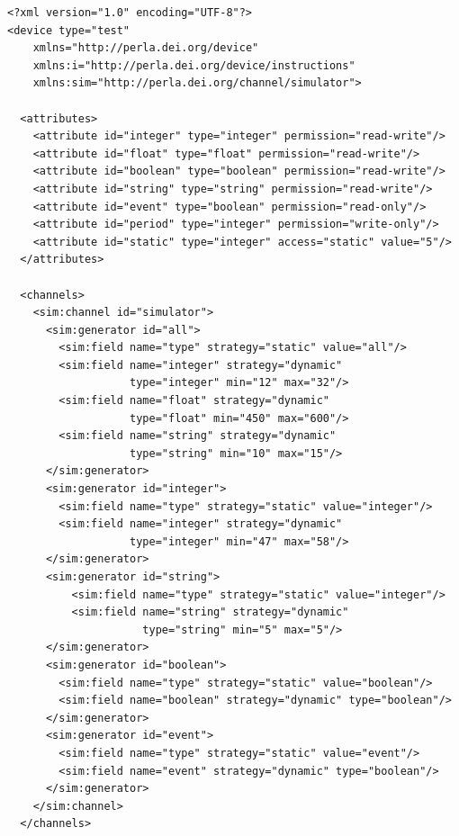 \begin{lstlisting}
<?xml version="1.0" encoding="UTF-8"?>
<device type="test"
    xmlns="http://perla.dei.org/device"
    xmlns:i="http://perla.dei.org/device/instructions"
    xmlns:sim="http://perla.dei.org/channel/simulator">

  <attributes>
    <attribute id="integer" type="integer" permission="read-write"/>
    <attribute id="float" type="float" permission="read-write"/>
    <attribute id="boolean" type="boolean" permission="read-write"/>
    <attribute id="string" type="string" permission="read-write"/>
    <attribute id="event" type="boolean" permission="read-only"/>
    <attribute id="period" type="integer" permission="write-only"/>
    <attribute id="static" type="integer" access="static" value="5"/>
  </attributes>

  <channels>
    <sim:channel id="simulator">
      <sim:generator id="all">
        <sim:field name="type" strategy="static" value="all"/>
        <sim:field name="integer" strategy="dynamic"
                   type="integer" min="12" max="32"/>
        <sim:field name="float" strategy="dynamic"
                   type="float" min="450" max="600"/>
        <sim:field name="string" strategy="dynamic"
                   type="string" min="10" max="15"/>
      </sim:generator>
      <sim:generator id="integer">
        <sim:field name="type" strategy="static" value="integer"/>
        <sim:field name="integer" strategy="dynamic"
                   type="integer" min="47" max="58"/>
      </sim:generator>
      <sim:generator id="string">
          <sim:field name="type" strategy="static" value="integer"/>
          <sim:field name="string" strategy="dynamic"
                     type="string" min="5" max="5"/>
      </sim:generator>
      <sim:generator id="boolean">
        <sim:field name="type" strategy="static" value="boolean"/>
        <sim:field name="boolean" strategy="dynamic" type="boolean"/>
      </sim:generator>
      <sim:generator id="event">
        <sim:field name="type" strategy="static" value="event"/>
        <sim:field name="event" strategy="dynamic" type="boolean"/>
      </sim:generator>
    </sim:channel>
  </channels>


\end{lstlisting}
